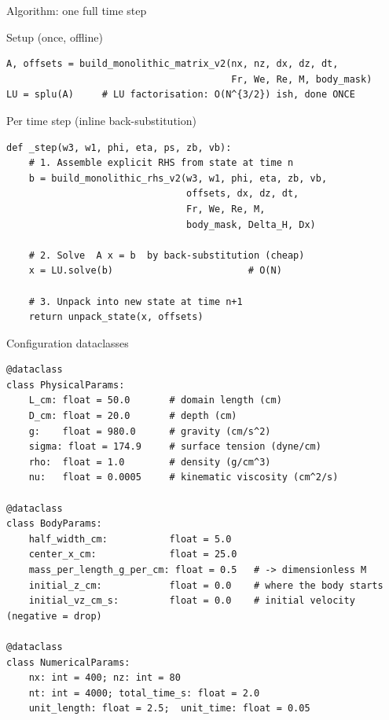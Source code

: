 \documentclass[aspectratio=169, 10pt]{beamer}
\begin{document}
\begin{frame}[fragile]{Algorithm: one full time step}
\begin{block}{Setup (once, offline)}
\begin{lstlisting}
A, offsets = build_monolithic_matrix_v2(nx, nz, dx, dz, dt,
                                        Fr, We, Re, M, body_mask)
LU = splu(A)     # LU factorisation: O(N^{3/2}) ish, done ONCE
\end{lstlisting}
\end{block}

\begin{block}{Per time step (inline back-substitution)}
\begin{lstlisting}
def _step(w3, w1, phi, eta, ps, zb, vb):
    # 1. Assemble explicit RHS from state at time n
    b = build_monolithic_rhs_v2(w3, w1, phi, eta, zb, vb,
                                offsets, dx, dz, dt,
                                Fr, We, Re, M,
                                body_mask, Delta_H, Dx)

    # 2. Solve  A x = b  by back-substitution (cheap)
    x = LU.solve(b)                        # O(N)

    # 3. Unpack into new state at time n+1
    return unpack_state(x, offsets)
\end{lstlisting}
\end{block}
\end{frame}


\begin{frame}[fragile]{Configuration dataclasses}
\begin{lstlisting}
@dataclass
class PhysicalParams:
    L_cm: float = 50.0       # domain length (cm)
    D_cm: float = 20.0       # depth (cm)
    g:    float = 980.0      # gravity (cm/s^2)
    sigma: float = 174.9     # surface tension (dyne/cm)
    rho:  float = 1.0        # density (g/cm^3)
    nu:   float = 0.0005     # kinematic viscosity (cm^2/s)

@dataclass
class BodyParams:
    half_width_cm:           float = 5.0
    center_x_cm:             float = 25.0
    mass_per_length_g_per_cm: float = 0.5   # -> dimensionless M
    initial_z_cm:            float = 0.0    # where the body starts
    initial_vz_cm_s:         float = 0.0    # initial velocity (negative = drop)

@dataclass
class NumericalParams:
    nx: int = 400; nz: int = 80
    nt: int = 4000; total_time_s: float = 2.0
    unit_length: float = 2.5;  unit_time: float = 0.05
\end{lstlisting}
\end{frame}
\end{document}
